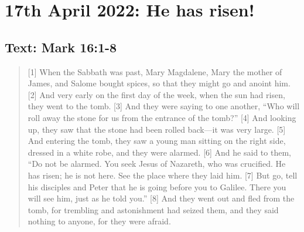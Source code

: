 \section{17th April 2022: He has risen!}
\subsection*{Text: Mark 16:1-8}
  \begin{quote}
    [1] When the Sabbath was past, Mary Magdalene, Mary the mother of James, and Salome bought spices, so that they might go and anoint him. [2] And very early on the first day of the week, when the sun had risen, they went to the tomb. [3] And they were saying to one another, “Who will roll away the stone for us from the entrance of the tomb?” [4] And looking up, they saw that the stone had been rolled back—it was very large. [5] And entering the tomb, they saw a young man sitting on the right side, dressed in a white robe, and they were alarmed. [6] And he said to them, “Do not be alarmed. You seek Jesus of Nazareth, who was crucified. He has risen; he is not here. See the place where they laid him. [7] But go, tell his disciples and Peter that he is going before you to Galilee. There you will see him, just as he told you.” [8] And they went out and fled from the tomb, for trembling and astonishment had seized them, and they said nothing to anyone, for they were afraid.
  \end{quote}
